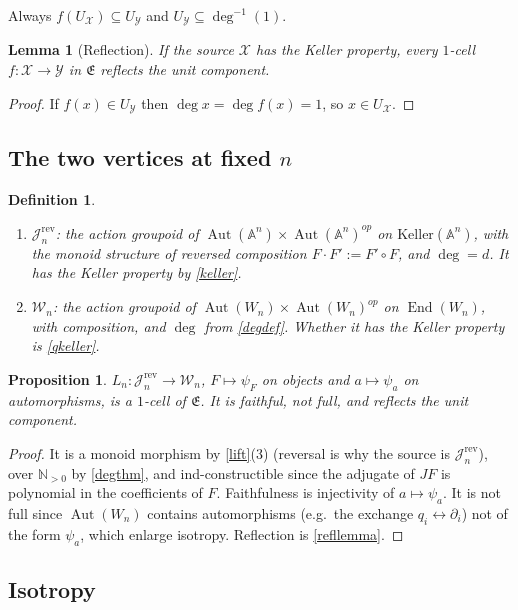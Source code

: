 \documentclass[11pt]{article}
\theoremstyle{change}
\newtheorem{definition}[equation]{Definition}
\newtheorem{prop}[equation]{Proposition}
\newtheorem{lemma}[equation]{Lemma}
\theoremstyle{nonumberplain}
\newtheorem{proof}{Proof}
\newcommand\NN{{\mathbb N}}
\renewcommand\AA{{\mathbb A}}
\newcommand\cJ{{\mathcal J}}
\newcommand\cW{{\mathcal W}}
\newcommand\cX{{\mathcal X}}
\newcommand\cY{{\mathcal Y}}
\newcommand\fE{{\mathfrak E}}
\newcommand\rev{{\mathrm{rev}}}
\DeclareMathOperator{\End}{End}
\DeclareMathOperator{\Aut}{Aut}
\begin{document}
Always $f(U_\cX) \subseteq U_\cY$ and $U_\cY \subseteq \deg^{-1}(1)$.

\begin{lemma}[Reflection\label{refllemma}]
If the source $\cX$ has the Keller property, every $1$-cell $f : \cX \to \cY$ in $\fE$ reflects the unit component.
\end{lemma}

\begin{proof}
If $f(x) \in U_\cY$ then $\deg x = \deg f(x) = 1$, so $x \in U_\cX$.
\end{proof}

\subsection{The two vertices at fixed $n$}

\begin{definition}
\begin{enumerate}
\item $\cJ_n^\rev$: the action groupoid of $\Aut(\AA^n) \times \Aut(\AA^n)^{op}$ on $\mathrm{Keller}(\AA^n)$, with the monoid structure of \emph{reversed} composition $F \cdot F' := F' \circ F$, and $\deg = d$. It has the Keller property by \cref{keller}.
\item $\cW_n$: the action groupoid of $\Aut(W_n) \times \Aut(W_n)^{op}$ on $\End(W_n)$, with composition, and $\deg$ from \cref{degdef}. Whether it has the Keller property is \cref{qkeller}.
\end{enumerate}
\end{definition}

\begin{prop}
$L_n : \cJ_n^\rev \to \cW_n$, $F \mapsto \psi_F$ on objects and $a \mapsto \psi_a$ on automorphisms, is a $1$-cell of $\fE$. It is faithful, not full, and reflects the unit component.
\end{prop}

\begin{proof}
It is a monoid morphism by \cref{lift}(3) (reversal is why the source is $\cJ_n^\rev$), over $\NN_{>0}$ by \cref{degthm}, and ind-constructible since the adjugate of $JF$ is polynomial in the coefficients of $F$. Faithfulness is injectivity of $a \mapsto \psi_a$. It is not full since $\Aut(W_n)$ contains automorphisms (e.g.\ the exchange $q_i \leftrightarrow \partial_i$) not of the form $\psi_a$, which enlarge isotropy. Reflection is \cref{refllemma}.
\end{proof}

\subsection{Isotropy}
\end{document}
